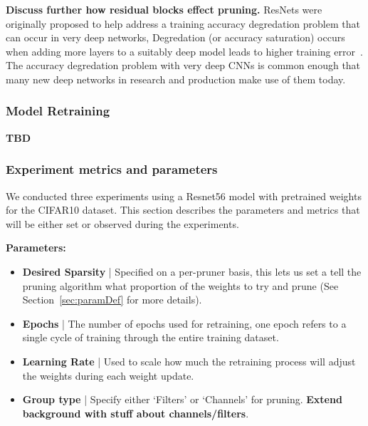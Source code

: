 \documentclass[../Dissertation.tex]{subfiles}
\begin{document}
\textbf{\color{red}Discuss further how residual blocks effect pruning.}
ResNets were originally proposed to help address a training accuracy degredation problem that can occur in very deep networks, Degredation (or accuracy saturation) occurs when adding more layers to a suitably deep model leads to higher training error~\autocite{heDeepResidualLearning2016}.
The accuracy degredation problem with very deep CNNs is common enough that many new deep networks in research and production make use of them today.

\subsubsection{Model Retraining}
\textbf{TBD}



\subsubsection{Experiment metrics and parameters}


We conducted three experiments using a Resnet56 model with pretrained weights for the CIFAR10 dataset.
This section describes the parameters and metrics that will be either set or observed during the experiments.

\singlespacing
\noindent\textbf{Parameters:}
\begin{itemize}
    \item \textbf{Desired Sparsity} | Specified on a per-pruner basis, this lets us set a tell the pruning algorithm what proportion of the weights to try and prune (See Section~\ref{sec:paramDef} for more details).
    \item \textbf{Epochs} | The number of epochs used for retraining, one epoch refers to a single cycle of training through the entire training dataset.
    \item \textbf{Learning Rate} | Used to scale how much the retraining process will adjust the weights during each weight update.
    \item \textbf{Group type} | Specify either `Filters' or `Channels' for pruning. \textbf{\color{red}Extend background with stuff about channels/filters}.
\end{itemize}
\doublespacing
\end{document}
